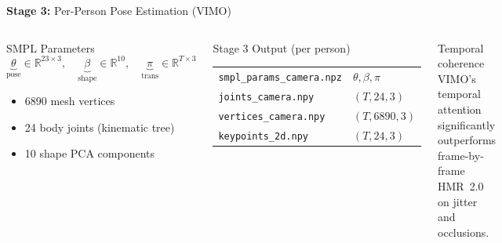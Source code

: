 \documentclass[aspectratio=169,11pt]{beamer}
\newcommand{\stage}[2]{\textcolor{accentblue}{\textbf{Stage #1:}} #2}
\begin{document}
\begin{frame}{\stage{3}{Per-Person Pose Estimation (VIMO)}}
\begin{columns}[T]
      \begin{block}{SMPL Parameters}
        \footnotesize
        \[
          \underbrace{\theta}_{\text{pose}} \in \mathbb{R}^{23\times3},\quad
          \underbrace{\beta}_{\text{shape}} \in \mathbb{R}^{10},\quad
          \underbrace{\pi}_{\text{trans}} \in \mathbb{R}^{T\times3}
        \]
        \begin{itemize}
          \item 6890 mesh vertices
          \item 24 body joints (kinematic tree)
          \item 10 shape PCA components
        \end{itemize}
      \end{block}
      \vspace{0.5em}
      \begin{block}{Stage 3 Output (per person)}
        \footnotesize
        \begin{tabular}{ll}
          \texttt{smpl\_params\_camera.npz} & $\theta, \beta, \pi$\\
          \texttt{joints\_camera.npy} & $(T,24,3)$\\
          \texttt{vertices\_camera.npy} & $(T,6890,3)$\\
          \texttt{keypoints\_2d.npy} & $(T,24,3)$\\
        \end{tabular}
      \end{block}
      \vspace{0.3em}
      \begin{alertblock}{Temporal coherence}
        \small VIMO's temporal attention significantly outperforms
        frame-by-frame HMR~2.0 on jitter and occlusions.
      \end{alertblock}
  \end{columns}
\end{frame}
\end{document}
